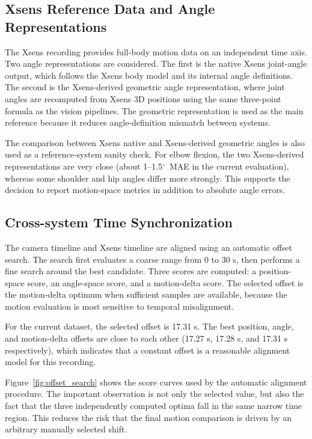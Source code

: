 \documentclass[12pt,a4paper]{article}
\newcommand{\degr}{\ensuremath{^\circ}}
\begin{document}
\subsection{Xsens Reference Data and Angle Representations}

The Xsens recording provides full-body motion data on an independent time axis.
Two angle representations are considered.
The first is the native Xsens joint-angle output, which follows the Xsens body
model and its internal angle definitions.
The second is the Xsens-derived geometric angle representation, where joint
angles are recomputed from Xsens 3D positions using the same three-point
formula as the vision pipelines.
The geometric representation is used as the main reference because it reduces
angle-definition mismatch between systems.

The comparison between Xsens native and Xsens-derived geometric angles is also
used as a reference-system sanity check.
For elbow flexion, the two Xsens-derived representations are very close
(about 1--1.5\degr\ MAE in the current evaluation), whereas some shoulder and
hip angles differ more strongly.
This supports the decision to report motion-space metrics in addition to
absolute angle errors.

\subsection{Cross-system Time Synchronization}

The camera timeline and Xsens timeline are aligned using an automatic offset
search.
The search first evaluates a coarse range from 0 to 30 s, then performs a fine
search around the best candidate.
Three scores are computed: a position-space score, an angle-space score, and a
motion-delta score.
The selected offset is the motion-delta optimum when sufficient samples are
available, because the motion evaluation is most sensitive to temporal
misalignment.

For the current dataset, the selected offset is 17.31 s.
The best position, angle, and motion-delta offsets are close to each other
(17.27 s, 17.28 s, and 17.31 s respectively), which indicates that a constant
offset is a reasonable alignment model for this recording.

Figure~\ref{fig:offset_search} shows the score curves used by the automatic
alignment procedure.
The important observation is not only the selected value, but also the fact
that the three independently computed optima fall in the same narrow time
region.
This reduces the risk that the final motion comparison is driven by an
arbitrary manually selected shift.
\end{document}
